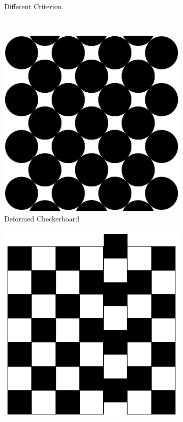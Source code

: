 \documentclass[
  oneside,
  11pt, a4paper,
  footinclude=true,
  headinclude=true,
  cleardoublepage=empty
]{scrbook}
\begin{document}
\begin{figure}[H]
\begin{subfigure}[t]{0.45\textwidth}
    \caption{Different Criterion.}
    \label{fig:critchecker}
\end{subfigure}
  \hspace*{\fill}\\
  \hspace*{\fill}
  \begin{subfigure}[t]{0.45\textwidth}
  	\includegraphics[width=\textwidth]{CheckerboardCircles}
      \caption{Deformed Checkerboard}
      \label{fig:deformedchecker}
  \end{subfigure}
      \hspace*{\fill} 
\begin{subfigure}[t]{0.45\textwidth}
	\includegraphics[width=\textwidth]{CheckerboardAperiodic}

\end{subfigure}
\end{figure}
\end{document}
